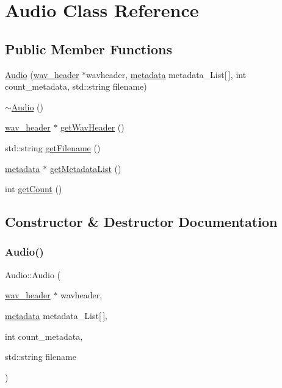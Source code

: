 \hypertarget{classAudio}{}\section{Audio Class Reference}
\label{classAudio}
\subsection*{Public Member Functions}
\begin{DoxyCompactItemize}
\item 
\hyperlink{classAudio_a219fef2857b36e3c0b4d04e1ec5d5927}{Audio} (\hyperlink{structwav__header}{wav\+\_\+header} $\ast$wavheader, \hyperlink{structmetadata}{metadata} metadata\+\_\+\+List\mbox{[}$\,$\mbox{]}, int count\+\_\+metadata, std\+::string filename)
\item 
\hyperlink{classAudio_ae8f54deecb5f48511aaab469e80294d6}{$\sim$\+Audio} ()
\item 
\hyperlink{structwav__header}{wav\+\_\+header} $\ast$ \hyperlink{classAudio_ac0c6115c2102ec602cdc99dc9929fb86}{get\+Wav\+Header} ()
\item 
std\+::string \hyperlink{classAudio_a33b723e5b540b84b1d7fcd59d0eee567}{get\+Filename} ()
\item 
\hyperlink{structmetadata}{metadata} $\ast$ \hyperlink{classAudio_a6da23521eb58061da65ac88823b875e6}{get\+Metadata\+List} ()
\item 
int \hyperlink{classAudio_acd1ab84a9b985a1792238313d9fc3448}{get\+Count} ()
\end{DoxyCompactItemize}


\subsection{Constructor \& Destructor Documentation}
\mbox{\label{classAudio_a219fef2857b36e3c0b4d04e1ec5d5927}} 
\subsubsection{\texorpdfstring{Audio()}{Audio()}}
{\footnotesize\ttfamily Audio\+::\+Audio (\begin{DoxyParamCaption}\item[{\hyperlink{structwav__header}{wav\+\_\+header} $\ast$}]{wavheader,  }\item[{\hyperlink{structmetadata}{metadata}}]{metadata\+\_\+\+List\mbox{[}$\,$\mbox{]},  }\item[{int}]{count\+\_\+metadata,  }\item[{std\+::string}]{filename }\end{DoxyParamCaption})}

